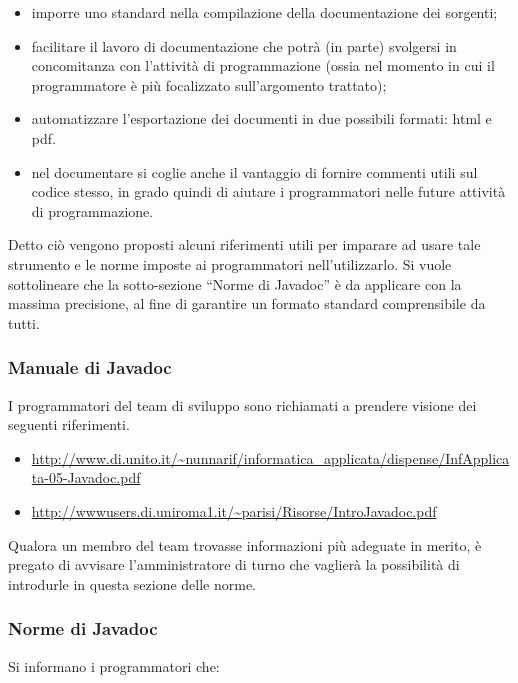 {\begin{itemize}
	\item imporre uno standard nella compilazione della documentazione dei sorgenti;
	\item facilitare il lavoro di documentazione che potrà (in parte) svolgersi in concomitanza con l'attività di programmazione (ossia nel momento in cui il programmatore è più focalizzato sull'argomento trattato);
	\item automatizzare l'esportazione dei documenti in due possibili formati: html e pdf.
	\item nel documentare si coglie anche il vantaggio di fornire commenti utili sul codice stesso, in grado quindi di aiutare i programmatori nelle future attività di programmazione.
\end{itemize}

Detto ciò vengono proposti alcuni riferimenti utili per imparare ad usare tale strumento e le norme imposte ai programmatori nell'utilizzarlo. Si vuole sottolineare che la sotto-sezione ``Norme di Javadoc'' è da applicare con la massima precisione, al fine di garantire un formato standard comprensibile da tutti.

\subsubsection{Manuale di Javadoc}

I programmatori del team di sviluppo sono richiamati a prendere visione dei seguenti riferimenti.

\begin{itemize}
	\item \url{http://www.di.unito.it/~nunnarif/informatica_applicata/dispense/InfApplicata-05-Javadoc.pdf}
	\item \url{http://wwwusers.di.uniroma1.it/~parisi/Risorse/IntroJavadoc.pdf}
\end{itemize}

Qualora un membro del team trovasse informazioni più adeguate in merito, è pregato di avvisare l'amministratore di turno che vaglierà la possibilità di introdurle in questa sezione delle norme.

\subsubsection{Norme di Javadoc}

Si informano i programmatori che:

}
